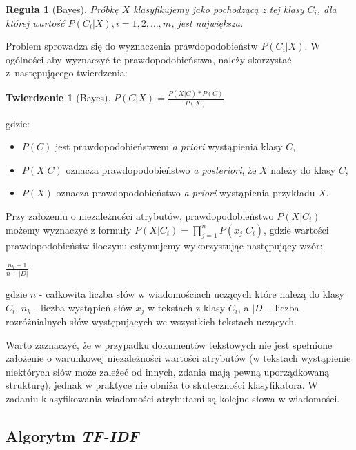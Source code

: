 \documentclass[a4paper,12pt]{article}
\newtheorem{rg}{Reguła}
\newtheorem{twr}{Twierdzenie}
\begin{document}
\begin{rg}[Bayes]
Próbkę $X$ klasyfikujemy jako pochodzącą z tej klasy $C_i$, dla której wartość $P(C_i|X), i = 1, 2, \dots, m$, jest największa.
\end{rg}
 
Problem sprowadza się do wyznaczenia prawdopodobieństw $P(C_i|X)$. W ogólności aby wyznaczyć te prawdopodobieństwa, należy skorzystać z~następującego twierdzenia:

\begin{twr}[Bayes]
$P(C|X) = \frac{P(X|C)*P(C)}{P(X)}$
\end{twr}
 
gdzie:

\begin{itemize}
\item \textbf{$P(C)$} jest prawdopodobieństwem \textit{a priori} wystąpienia klasy $C$,
\item \textbf{$P(X|C)$} oznacza prawdopodobieństwo \textit{a posteriori}, że $X$ należy do klasy $C$,
\item \textbf{$P(X)$} oznacza prawdopodobieństwo \textit{a priori} wystąpienia przykładu $X$.
\end{itemize} 
 
Przy założeniu o niezależności atrybutów, prawdopodobieństwo $P(X|C_i)$ możemy wyznaczyć z formuły $P(X|C_i) = \prod\limits_{j=1}^n P(x_j|C_i)$, gdzie wartości prawdopodobieństw iloczynu estymujemy wykorzystując następujący wzór:

\begin{center}
$\frac{n_k + 1}{n + |D|}$
\end{center}

gdzie $n$ - całkowita liczba słów w wiadomościach uczących które należą do klasy $C_i$, $n_k$ - liczba wystąpień słów $x_j$ w tekstach z klasy $C_i$, a $|D|$ - liczba rozróżnialnych słów występujących we wszystkich tekstach uczących.

Warto zaznaczyć, że w przypadku dokumentów tekstowych nie jest spełnione założenie o warunkowej niezależności wartości atrybutów (w tekstach wystąpienie niektórych słów może zależeć od innych, zdania mają pewną uporządkowaną strukturę), jednak w praktyce nie obniża to skuteczności klasyfikatora. W zadaniu klasyfikowania wiadomości atrybutami są kolejne słowa w wiadomości.\\

\subsection{Algorytm \textit{TF-IDF}}
\end{document}
